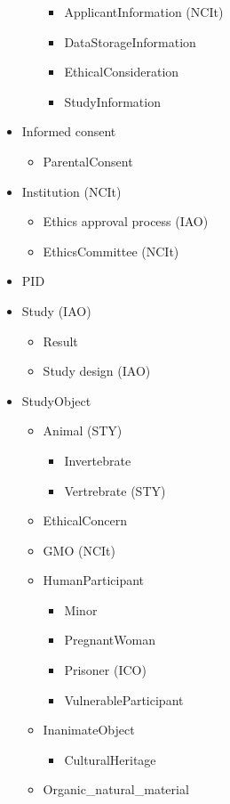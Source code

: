\documentclass[10pt]{article}
\begin{document}
\begin{itemize}
\begin{itemize}
 			 	\begin{itemize}
 			 		\item ApplicantInformation (NCIt)
 			 		\item DataStorageInformation
 			 		\item EthicalConsideration
 			 		\item StudyInformation
 				\end{itemize}
 	\end{itemize}
 \item Informed consent
  	\begin{itemize}
  		\item ParentalConsent
 	\end{itemize}
 \item Institution (NCIt)
 	 	\begin{itemize}
 	 		\item Ethics approval process (IAO)
 	 		\item EthicsCommittee (NCIt)
 		\end{itemize}
 \item PID
 \item Study (IAO)
 	 	\begin{itemize}
 	 		\item Result
 	 		\item Study design (IAO)
 	\end{itemize}
 \item StudyObject
 	\begin{itemize}
 	\item Animal (STY)
 	 	\begin{itemize}
 	 	\item Invertebrate
 	 	\item Vertrebrate (STY)
 	\end{itemize}
 	\item EthicalConcern
 	\item GMO (NCIt)
 	\item HumanParticipant
 	 	\begin{itemize}
 	 	\item Minor
 	 	\item PregnantWoman
 	 	\item Prisoner (ICO)
 	 	\item VulnerableParticipant
 	\end{itemize}
 	\item InanimateObject
 	 	\begin{itemize}
 	 	\item CulturalHeritage
 	\end{itemize}
 	\item Organic\_natural\_material
 	\end{itemize}
 \end{itemize}
    
\end{document}
